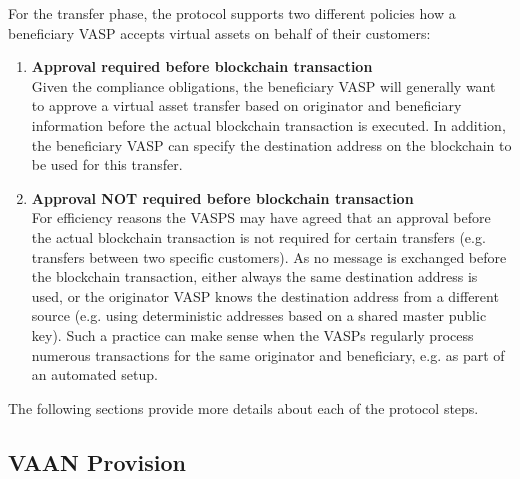 \documentclass{article}
\begin{document}
For the transfer phase, the protocol supports two different policies how a beneficiary VASP accepts virtual assets on behalf of their customers:
\renewcommand{\theenumi}{\alph{enumi}}
\begin{enumerate}
    \item \textbf{Approval required before blockchain transaction}\\
    Given the compliance obligations, the beneficiary VASP will generally want to approve a virtual asset transfer based on originator and beneficiary information before the actual blockchain transaction is executed. In addition, the beneficiary VASP can specify the destination address on the blockchain to be used for this transfer.
    \item \textbf{Approval NOT required before blockchain transaction}\\
    For efficiency reasons the VASPS may have agreed that an approval before the actual blockchain transaction is not required for certain transfers (e.g. transfers between two specific customers). As no message is exchanged before the blockchain transaction, either always the same destination address is used, or the originator VASP knows the destination address from a different source (e.g. using deterministic addresses based on a shared master public key). Such a practice can make sense when the VASPs regularly process numerous transactions for the same originator and beneficiary, e.g. as part of an automated setup.
\end{enumerate}

The following sections provide more details about each of the protocol steps.

\subsection{VAAN Provision}
\end{document}
